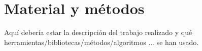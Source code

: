 \chapter{Material y métodos}
\label{sec:material_y_metodos}

Aquí debería estar la descripción del trabajo realizado y qué
herramientas/bibliotecas/métodos/algoritmos ... se han usado.
